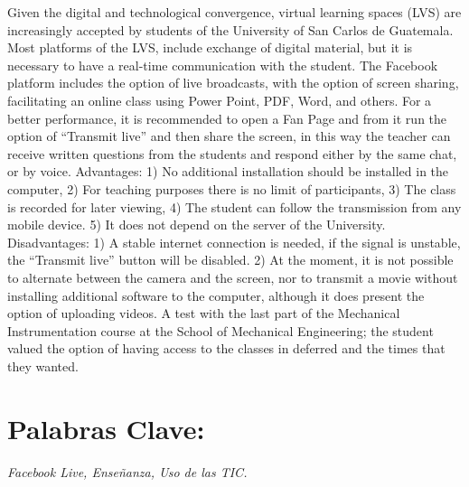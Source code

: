 \documentclass[11pt,spanish,Letterpaper,openany]{book}
\begin{document}
Given the digital and technological convergence, virtual learning spaces (LVS) are increasingly accepted by students of the University of San Carlos de Guatemala. Most platforms of the LVS, include exchange of digital material, but it is necessary to have a real-time communication with the student. The Facebook platform includes the option of live broadcasts, with the option of screen sharing, facilitating an online class using Power Point, PDF, Word, and others. For a better performance, it is recommended to open a Fan Page and from it run the option of ``Transmit live'' and then share the screen, in this way the teacher can receive written questions from the students and respond either by the same chat, or by voice. Advantages: 1) No additional installation should be installed in the computer, 2) For teaching purposes there is no limit of participants, 3) The class is recorded for later viewing, 4) The student can follow the transmission from any mobile device. 5) It does not depend on the server of the University. Disadvantages: 1) A stable internet connection is needed, if the signal is unstable, the ``Transmit live'' button will be disabled. 2) At the moment, it is not possible to alternate between the camera and the screen, nor to transmit a movie without installing additional software to the computer, although it does present the option of uploading videos. A test with the last part of the Mechanical Instrumentation course at the School of Mechanical Engineering; the student valued the option of having access to the classes in deferred and the times that they wanted.

\hypertarget{palabras-clave-4}{%
\section*{Palabras Clave:}\label{palabras-clave-4}}

\emph{Facebook Live, Enseñanza, Uso de las TIC.}
\end{document}
